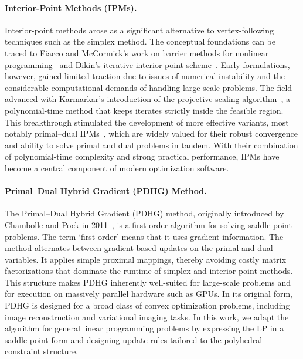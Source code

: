 \documentclass[twoside,12pt,openright]{report}  %
\begin{document}
\paragraph{Interior-Point Methods (IPMs).}  
Interior-point methods arose as a significant alternative to vertex-following techniques such as the simplex method. The conceptual foundations can be traced to Fiacco and McCormick’s work on barrier methods for nonlinear programming~\cite{fiacco1964computational} and Dikin’s iterative interior-point scheme~\cite{dikin1967iterative}. Early formulations, however, gained limited traction due to issues of numerical instability and the considerable computational demands of handling large-scale problems.  
The field advanced with Karmarkar’s introduction of the projective scaling algorithm~\cite{karmarkar1984new}, a polynomial-time method that keeps iterates strictly inside the feasible region. This breakthrough stimulated the development of more effective variants, most notably primal–dual IPMs~\cite{wright1997primal}, which are widely valued for their robust convergence and ability to solve primal and dual problems in tandem.  With their combination of polynomial-time complexity and strong practical performance, IPMs have become a central component of modern optimization software.

\paragraph{Primal–Dual Hybrid Gradient (PDHG) Method.} The Primal–Dual Hybrid Gradient (PDHG) method, originally introduced by Chambolle and Pock in 2011~\cite{chambolle2011first}, is a first-order algorithm for solving saddle-point problems. The term `first order' means that it uses gradient information. The method alternates between gradient-based updates on the primal and dual variables. It applies simple proximal mappings, thereby avoiding costly matrix factorizations that dominate the runtime of simplex and interior-point methods. This structure makes PDHG inherently well-suited for large-scale problems and for execution on massively parallel hardware such as GPUs. In its original form, PDHG is designed for a broad class of convex optimization problems, including image reconstruction and variational imaging tasks. In this work, we adapt the algorithm for general linear programming problems by expressing the LP in a saddle-point form and designing update rules tailored to the polyhedral constraint structure. \\
\end{document}
